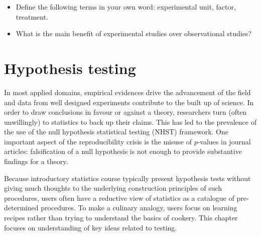 \documentclass[
  11pt,
  letterpaper,
]{scrbook}
\providecommand{\tightlist}{%
  \setlength{\itemsep}{0pt}\setlength{\parskip}{0pt}}\usepackage{longtable,booktabs,array}
\theoremstyle{definition}
\theoremstyle{definition}
\theoremstyle{remark}
\begin{document}
\begin{tcolorbox}[enhanced jigsaw, left=2mm, leftrule=.75mm, coltitle=black, breakable, bottomrule=.15mm, colframe=quarto-callout-tip-color-frame, titlerule=0mm, colbacktitle=quarto-callout-tip-color!10!white, rightrule=.15mm, toprule=.15mm, title=\textcolor{quarto-callout-tip-color}{\faLightbulb}\hspace{0.5em}{Your turn}, opacityback=0, toptitle=1mm, bottomtitle=1mm, arc=.35mm, opacitybacktitle=0.6, colback=white]

\begin{itemize}
\tightlist
\item
  Define the following terms in your own word: experimental unit,
  factor, treatment.
\item
  What is the main benefit of experimental studies over observational
  studies?
\end{itemize}

\end{tcolorbox}


\chapter{Hypothesis testing}\label{hypothesis-testing}

In most applied domains, empirical evidences drive the advancement of
the field and data from well designed experiments contribute to the
built up of science. In order to draw conclusions in favour or against a
theory, researchers turn (often unwillingly) to statistics to back up
their claims. This has led to the prevalence of the use of the null
hypothesis statistical testing (NHST) framework. One important aspect of
the reproducibility crisis is the misuse of \(p\)-values in journal
articles: falsification of a null hypothesis is not enough to provide
substantive findings for a theory.

Because introductory statistics course typically present hypothesis
tests without giving much thoughts to the underlying construction
principles of such procedures, users often have a reductive view of
statistics as a catalogue of pre-determined procedures. To make a
culinary analogy, users focus on learning recipes rather than trying to
understand the basics of cookery. This chapter focuses on understanding
of key ideas related to testing.
\end{document}
